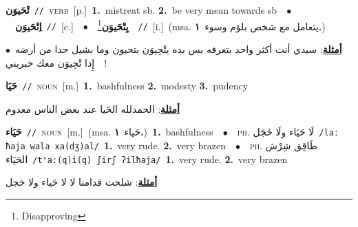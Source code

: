 \documentclass[10pt,a4paper,twoside]{article} %
\begin{document}
\begin{multicols}{2}
{\setlength\topsep{0pt}\textbf{\foreignlanguage{arabic}{تْحَيوَن}}\ {\color{gray}\texttt{//}\color{black}}\ \textsc{verb}\ [p.]\ \textbf{1.}~mistreat sb.  \textbf{2.}~be very mean towards sb\ \ $\bullet$\ \ \setlength\topsep{0pt}\textbf{\foreignlanguage{arabic}{اِتْحَيوَن}}\ {\color{gray}\texttt{//}\color{black}}\ [c.]\ \ $\bullet$\ \ \setlength\topsep{0pt}\textbf{\foreignlanguage{arabic}{يِتْحَيوَن}}\footnote{Disapproving}\ \ {\color{gray}\texttt{//}\color{black}}\ [i.]\ \color{gray}(msa. \foreignlanguage{arabic}{يتعامل مع شخص بلؤم وسوء}~\foreignlanguage{arabic}{\textbf{١.}})\color{black}\  \begin{flushright}\color{gray}\foreignlanguage{arabic}{\textbf{\underline{\foreignlanguage{arabic}{أمثلة}}}: سيدي أنت أكثر واحد بتعرفه بس بده يتْحِيوَن بتحيون وما بشيل حدا من أرضه\ $\bullet$\ \  إِذا تْحِيوَن معك خبريني!}\end{flushright}\color{black}} \vspace{2mm}

{\setlength\topsep{0pt}\textbf{\foreignlanguage{arabic}{حَيَا}}\ {\color{gray}\texttt{//}\color{black}}\ \textsc{noun}\ [m.]\ \textbf{1.}~bashfulness  \textbf{2.}~modesty  \textbf{3.}~pudency\  \begin{flushright}\color{gray}\foreignlanguage{arabic}{\textbf{\underline{\foreignlanguage{arabic}{أمثلة}}}: الحمدلله الحَيا عند بعض الناس معدوم}\end{flushright}\color{black}} \vspace{2mm}

{\setlength\topsep{0pt}\textbf{\foreignlanguage{arabic}{حَيَاء}}\ {\color{gray}\texttt{//}\color{black}}\ \textsc{noun}\ [m.]\ \color{gray}(msa. \foreignlanguage{arabic}{حَياء}~\foreignlanguage{arabic}{\textbf{١.}})\color{black}\ \textbf{1.}~bashfulness\ \ $\bullet$\ \ \textsc{ph.} \color{gray} \foreignlanguage{arabic}{لَا حَيَاء ولَا خَجَل}\color{black}\ {\color{gray}\texttt{/{\sffamily laː ħaja wala xa(dʒ)al}/}\color{black}}\ \textbf{1.}~very rude.  \textbf{2.}~very brazen\ \ $\bullet$\ \ \textsc{ph.} \color{gray} \foreignlanguage{arabic}{طَاقِق شِرْش الحَيَاء}\color{black}\ {\color{gray}\texttt{/{\sffamily tˤaː(q)i(q) ʃirʃ ʔilħaja}/}\color{black}}\ \textbf{1.}~very rude.  \textbf{2.}~very brazen\  \begin{flushright}\color{gray}\foreignlanguage{arabic}{\textbf{\underline{\foreignlanguage{arabic}{أمثلة}}}: شلحت قدامنا لا لا حَياء ولا خجل}\end{flushright}\color{black}} \vspace{2mm}


\end{multicols}
\end{document}
